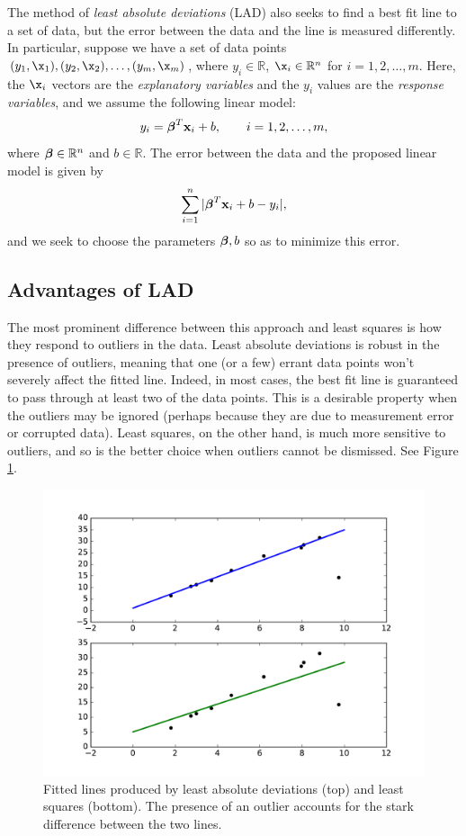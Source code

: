 The method of \emph{least absolute deviations} (LAD) also seeks to find a best fit line to a set of data, but the error between the data and the line is measured differently.
In particular, suppose we have a set of data points $(y_1, \x_1), (y_2, \x_2), \ldots, (y_m, \x_m)$, where $y_i \in \mathbb{R}$, $\x_i \in \mathbb{R}^n$ for $i = 1, 2, \ldots, m$.
Here, the $\x_i$ vectors are the \emph{explanatory variables} and the $y_i$ values are the \emph{response variables}, and we assume the following linear model:
\[
y_i = \boldsymbol{\beta}^T\mathbf{x}_i + b, \qquad i = 1, 2, \ldots, m,
\]
where $\boldsymbol{\beta}\in\mathbb{R}^n$ and $b \in \mathbb{R}$.
The error between the data and the proposed linear model is given by
\[
\sum_{i=1}^n |\boldsymbol{\beta}^T\mathbf{x}_i + b - y_i|,
\]
and we seek to choose the parameters $\boldsymbol{\beta}, b$ so as to minimize this error.

\subsection*{Advantages of LAD}
The most prominent difference between this approach and least squares is how they respond to outliers in the data.
Least absolute deviations is robust in the presence of outliers, meaning that one (or a few) errant data points won't severely affect the fitted line.
Indeed, in most cases, the best fit line is guaranteed to pass through at least two of the data points.
This is a desirable property when the outliers may be ignored (perhaps because they are due to measurement error or corrupted data).
Least squares, on the other hand, is much more sensitive to outliers, and so is the better choice when outliers cannot be dismissed.
See Figure \ref{fig:leastAbsDev}.

\begin{figure}
\centering
\includegraphics[width=\textwidth]{figures/leastAbsDev.pdf}
\caption{Fitted lines produced by least absolute deviations (top) and least squares (bottom). The presence of an outlier accounts for the
stark difference between the two lines.}
\label{fig:leastAbsDev}
\end{figure}

